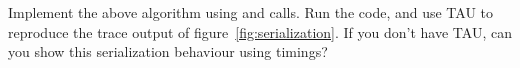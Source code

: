   \label{ex:linear-sequential}
  Implement the above algorithm using  and  calls.
  Run the code, and use TAU to reproduce the trace output
  of figure~\ref{fig:serialization}.
  If you don't have TAU, can you show this serialization
  behaviour using timings?
